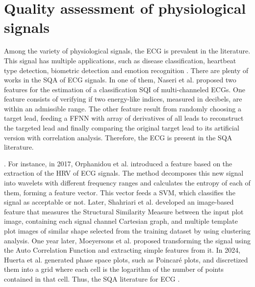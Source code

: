 \section{Quality assessment of physiological signals}

Among the variety of physiological signals, the \gls{ECG} is prevalent in the literature. This signal has multiple applications, such as disease classification, heartbeat type detection, biometric detection and emotion recognition \cite{ecg-1}. There are plenty of works in the \gls{SQA} of ECG signals. In one of them, Naseri et al. \cite{ecg-2} proposed two features for the estimation of a classification \gls{SQI} of multi-channeled \gls{ECG}s. One feature consists of verifying if two energy-like indices, measured in decibels, are within an admissible range. The other feature result from randomly choosing a target lead, feeding a \gls{FFNN} with array of derivatives of all leads to reconstruct the targeted lead and finally comparing the original target lead to its artificial version with correlation analysis. Therefore, the \gls{ECG} is present in the \gls{SQA} literature.

. For instance, in 2017, Orphanidou et al. \cite{ecg-3} introduced a feature based on the extraction of the \gls{HRV} of \gls{ECG} signals. The method decomposes this new signal into wavelets with different frequency ranges and calculates the entropy of each of them, forming a feature vector. This vector feeds a \gls{SVM}, which classifies the signal as acceptable or not. Later, Shahriari et al. \cite{ecg-4} developed an image-based feature that measures the Structural Similarity Measure between the input plot image, containing each signal channel Cartesian graph, and multiple template plot images of similar shape selected from the training dataset by using clustering analysis. One year later, Moeyersons et al. \cite{ecg-5} proposed transforming the signal using the Auto Correlation Function and extracting simple features from it. In 2024, Huerta et al. \cite{ecg-6} generated phase space plots, such as Poincaré plots, and discretized them into a grid where each cell is the logarithm of the number of points contained in that cell. Thus, the \gls{SQA} literature for \gls{ECG} .

